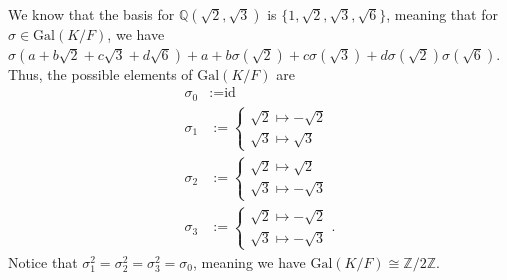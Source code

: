 \documentclass[10pt]{extarticle}
\newcommand{\Q}{\mathbb{Q}}
\newcommand{\Z}{\mathbb{Z}}
\begin{document}
  We know that the basis for $\Q(\sqrt{2},\sqrt{3})$ is $\{1,\sqrt{2},\sqrt{3},\sqrt{6}\}$, meaning that for $\sigma\in \text{Gal}(K/F)$, we have $\sigma(a + b\sqrt{2} + c\sqrt{3} + d\sqrt{6}) + a + b\sigma(\sqrt{2}) + c\sigma(\sqrt{3}) + d\sigma(\sqrt{2})\sigma(\sqrt{6})$. Thus, the possible elements of $\text{Gal}(K/F)$ are
  \begin{align*}
    \sigma_0 &:= \text{id}\\
    \sigma_1 &:= \begin{cases}
      \sqrt{2} \mapsto -\sqrt{2}\\
      \sqrt{3} \mapsto \sqrt{3}
    \end{cases}\\
      \sigma_2 &:= \begin{cases}
        \sqrt{2} \mapsto \sqrt{2}\\
        \sqrt{3} \mapsto -\sqrt{3}
      \end{cases}\\
        \sigma_3 &:= \begin{cases}
          \sqrt{2} \mapsto -\sqrt{2}\\
          \sqrt{3} \mapsto -\sqrt{3}
        \end{cases}.
  \end{align*}
  Notice that $\sigma_1^{2} = \sigma_2^{2} = \sigma_3^{2} = \sigma_0$, meaning we have $\text{Gal}(K/F)\cong \Z/2\Z$.
\end{document}
